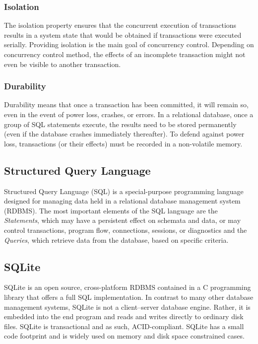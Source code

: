     \subsubsection{Isolation}
      The isolation property ensures that the concurrent execution of transactions results in a system state that would be obtained if transactions were executed serially. Providing isolation is the main goal of concurrency control. Depending on concurrency control method, the effects of an incomplete transaction might not even be visible to another transaction.

    \subsubsection{Durability}
      Durability means that once a transaction has been committed, it will remain so, even in the event of power loss, crashes, or errors. In a relational database, once a group of SQL statements execute, the results need to be stored permanently (even if the database crashes immediately thereafter). To defend against power loss, transactions (or their effects) must be recorded in a non-volatile memory.

  \subsection{Structured Query Language}
    Structured Query Language (SQL) is a special-purpose programming language designed for managing data held in a relational database management system (RDBMS). The most important elements of the SQL language are the \emph{Statements}, which may have a persistent effect on schemata and data, or may control transactions, program flow, connections, sessions, or diagnostics and the \emph{Queries}, which retrieve data from the database, based on specific criteria.

  \subsection{SQLite}
    SQLite\cite{sqlite} is an open source, cross-platform RDBMS contained in a C programming library that offers a full SQL implementation. In contrast to many other database management systems, SQLite is not a client–server database engine. Rather, it is embedded into the end program and reads and writes directly to ordinary disk files. SQLite is transactional and as such, ACID-compliant. SQLite has a small code footprint and is widely used on memory and disk space constrained cases.

